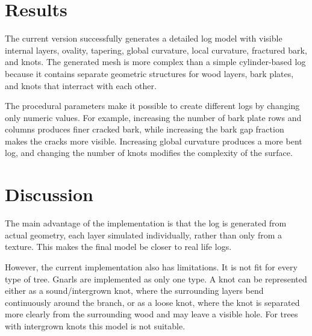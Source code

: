 \documentclass{egpubl}
\begin{document}

\section{Results}

The current version successfully generates a detailed log model with visible internal layers, ovality, tapering, global curvature, local curvature, fractured bark, and knots. The generated mesh is more complex than a simple cylinder-based log because it contains separate geometric structures for wood layers, bark plates, and knots that interract with each other.

The procedural parameters make it possible to create different logs by changing only numeric values. For example, increasing the number of bark plate rows and columns produces finer cracked bark, while increasing the bark gap fraction makes the cracks more visible. Increasing global curvature produces a more bent log, and changing the number of knots modifies the complexity of the surface.

%
%


\section{Discussion}

The main advantage of the implementation is that the log is generated from actual geometry, each layer simulated individually, rather than only from a texture. This makes the final model be closer to real life logs.

However, the current implementation also has limitations. It is not fit for every type of tree. Gnarls are implemented as only one type. A knot can be represented either as a sound/intergrown knot, where the surrounding layers bend continuously around the branch, or as a loose knot, where the knot is separated more clearly from the surrounding wood and may leave a visible hole. For trees with intergrown knots this model is not suitable.
\end{document}

